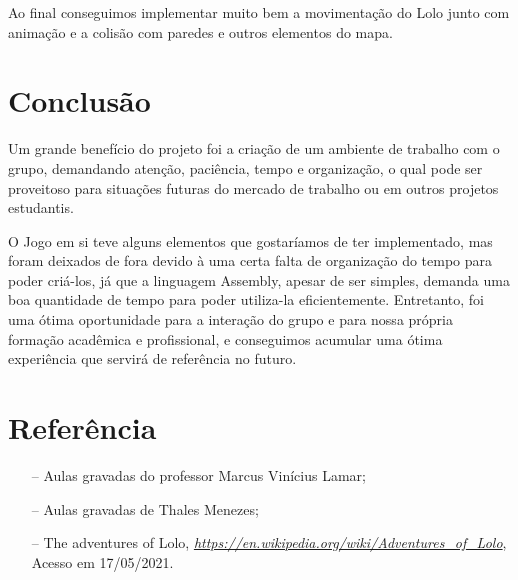 \documentclass[10pt, conference, compsocconf]{IEEEtran}
\begin{document}
Ao final conseguimos implementar muito bem a movimentação do Lolo junto com
animação e a colisão com paredes e outros elementos do mapa.

\section{Conclusão}
Um grande benefício do projeto foi a criação de um ambiente de trabalho com o
grupo, demandando atenção, paciência, tempo e organização, o qual pode ser
proveitoso para situações futuras do mercado de trabalho ou em outros projetos
estudantis.

O Jogo em si teve alguns elementos que gostaríamos de ter implementado, mas
foram deixados de fora devido à uma certa falta de organização do tempo para
poder criá-los, já que a linguagem Assembly, apesar de ser simples, demanda uma
boa quantidade de tempo para poder utiliza-la eficientemente. Entretanto, foi
uma ótima oportunidade para a interação do grupo e para nossa própria formação
acadêmica e profissional, e conseguimos acumular uma ótima experiência que
servirá de referência no futuro.


\section{Referência}
\label{sec:Conclusao}
\begin{itemize}
    \item[--] Aulas gravadas do professor Marcus Vinícius Lamar;
    \item[--] Aulas gravadas de Thales Menezes;
    \item[--] The adventures of Lolo, \textit{\url{https://en.wikipedia.org/wiki/Adventures_of_Lolo}}, Acesso em 17/05/2021.

\end{itemize}



%


\end{document}
